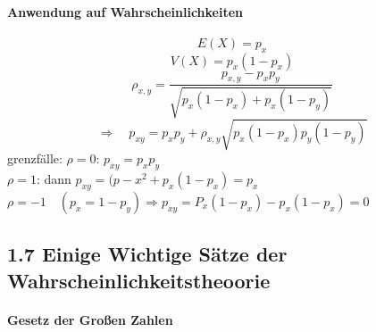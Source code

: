 \documentclass[a4paper]{article}
\theoremstyle{definition}
\theoremstyle{remark}
\begin{document}
\paragraph{Anwendung auf Wahrscheinlichkeiten}
\label{par:anwendung_auf_wahrscheinlichkeiten}
\begin{equation}
  E(X)=p_x
\end{equation}
\begin{equation}
  V(X)= p_x(1-p_x)
\end{equation}
 \begin{equation}
   \rho_{x,y}=\frac{p_{x,y}-p_xp_y}{\sqrt{p_x(1-p_x)+p_x(1-p_y)}}
 \end{equation}
\begin{equation}
  \Rightarrow\quad p_{xy}=p_xp_y+\rho _{x,y}\sqrt{p_x(1-p_x)p_y(1-p_y)}
\end{equation}
grenzfälle:
$\rho =0$: $ p_{xy}=p_xp_y$\\ 
$\rho =1$: dann $p_{xy}=(p-x^2+p_x(1-p_x)=p_x$\\
  $  \rho =-1\quad (p_x=1-p_y) \Rightarrow p_{xy}=P_x(1-p_x)-p_x(1-p_x)=0$
  \subsection{1.7 Einige Wichtige Sätze der Wahrscheinlichkeitstheoorie}
 \label{sub:1_7_einige_wichtige_satze_der_wahrscheinlichkeitstheoorie}
 
\paragraph{Gesetz  der Großen Zahlen}
\label{par:gesetz_der_grossen_zahlen}
\end{document}
